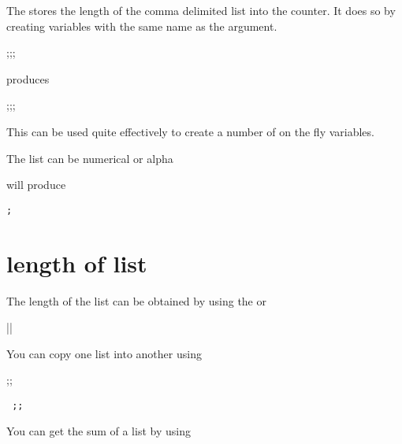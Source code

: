 The  stores the length of the comma delimited list into the counter. It does so by creating variables with the same name as the argument.

\begin{teX}
\tempi;\tempii;\tempiii;\tempiv 
\end{teX}

produces 

\tempi;\tempii;\tempiii;\tempiv 

This can be used quite effectively to create a number of on the fly variables.

The list can be numerical or alpha

\begin{teX}
\end{teX}


will produce


\texttt{\medskip\tempi; \tempii \medskip }

\section*{length of list}

The length of the list can be obtained by using the  or 

\begin{teX}
\listlen{} 
\end{teX}

\medskip

|| \texttt{}\\


\listlen{} 
\medskip

You can copy one list into another using 

\begin{teX}
\copiedlisti;\copiedlistii;\copiedlistiii 
\end{teX}

{\obeylines\tt
{}
\copiedlisti;\copiedlistii;\copiedlistiii 
}


You can get the sum of a list by using 


\thelistsum 
{}
\thelistsum 
{}


